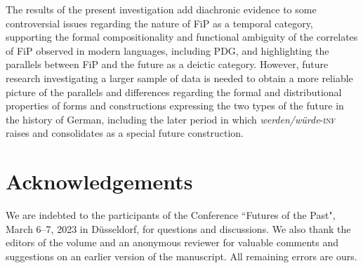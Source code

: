 \documentclass[output=paper,colorlinks,citecolor=brown]{langscibook}
\begin{document}
The results of the present investigation add diachronic evidence to some controversial issues regarding the nature of FiP as a temporal category, supporting the formal compositionality and functional ambiguity of the correlates of FiP observed in modern languages, including PDG, and highlighting the parallels between FiP and the future as a deictic category. However, future research investigating a larger sample of data is needed to obtain a more reliable picture of the parallels and differences regarding the formal and distributional properties of forms and constructions expressing the two types of the future in the history of German, including the later period in which \textit{werden/würde}-\textsc{inf} raises and consolidates as a special future construction.

\section*{Acknowledgements}
We are indebted to the participants of the Conference ``Futures of the Past", March 6--7, 2023 in Düsseldorf, for questions and discussions. We also thank the editors of the volume and an anonymous reviewer for valuable comments and suggestions on an earlier version of the manuscript. All remaining errors are ours. 

\sloppy
\printbibliography[heading=subbibliography,notkeyword=this]
\end{document}
